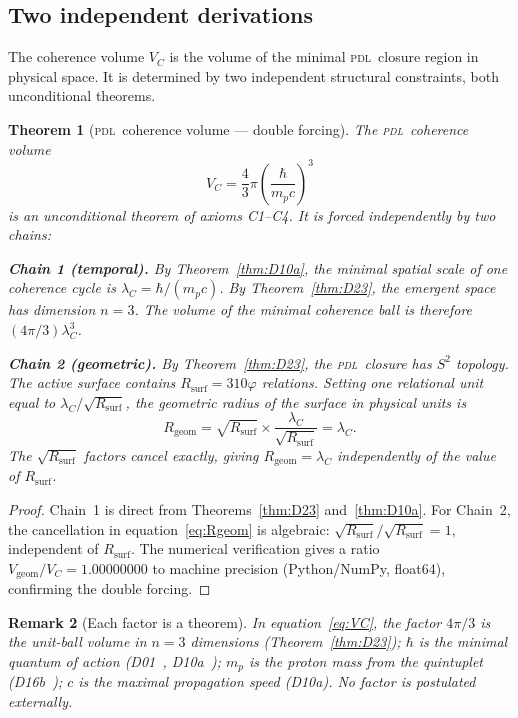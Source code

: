 \documentclass[12pt,a4paper]{article}
\newtheorem{theorem}{Theorem}[section]
\newtheorem{remark}[theorem]{Remark}
\newcommand{\hb}{\hbar}
\newcommand{\PDL}{\textsc{pdl}}
\newcommand{\Rsurf}{R_{\mathrm{surf}}}
\newcommand{\lambdaC}{\lambda_C}
\newcommand{\VC}{V_C}
\newcommand{\vp}{\varphi}
\begin{document}
\subsection{Two independent derivations}

The coherence volume $\VC$ is the volume of the minimal \PDL\ closure region in physical space. It is determined by two independent structural constraints, both unconditional theorems.

\begin{theorem}[\PDL\ coherence volume --- double forcing]
\label{thm:VC}
The \PDL\ coherence volume
\begin{equation}
\VC = \frac{4}{3}\pi\left(\frac{\hb}{m_p c}\right)^3
\label{eq:VC}
\end{equation}
is an unconditional theorem of axioms C1--C4. It is forced independently by two chains:

\medskip
\noindent\textbf{Chain 1 (temporal).} By Theorem~\ref{thm:D10a}, the minimal spatial scale of one coherence cycle is $\lambdaC = \hb/(m_p c)$. By Theorem~\ref{thm:D23}, the emergent space has dimension $n=3$. The volume of the minimal coherence ball is therefore $(4\pi/3)\lambdaC^3$.

\noindent\textbf{Chain 2 (geometric).} By Theorem~\ref{thm:D23}, the \PDL\ closure has $S^2$ topology. The active surface contains $\Rsurf = 310\vp$ relations. Setting one relational unit equal to $\lambdaC/\sqrt{\Rsurf}$, the geometric radius of the surface in physical units is
\begin{equation}
R_{\mathrm{geom}} = \sqrt{\Rsurf}\times\frac{\lambdaC}{\sqrt{\Rsurf}} = \lambdaC.
\label{eq:Rgeom}
\end{equation}
The $\sqrt{\Rsurf}$ factors cancel exactly, giving $R_{\mathrm{geom}} = \lambdaC$ independently of the value of $\Rsurf$.
\end{theorem}

\begin{proof}
Chain~1 is direct from Theorems~\ref{thm:D23} and~\ref{thm:D10a}. For Chain~2, the cancellation in equation~\eqref{eq:Rgeom} is algebraic: $\sqrt{\Rsurf}/\sqrt{\Rsurf} = 1$, independent of $\Rsurf$. The numerical verification gives a ratio $V_{\mathrm{geom}}/\VC = 1.00000000$ to machine precision (Python/NumPy, float64), confirming the double forcing.
\end{proof}

\begin{remark}[Each factor is a theorem]
In equation~\eqref{eq:VC}, the factor $4\pi/3$ is the unit-ball volume in $n=3$ dimensions (Theorem~\ref{thm:D23}); $\hb$ is the minimal quantum of action (D01~\cite{PDL_D01_2026}, D10a~\cite{PDL_D10a_2026}); $m_p$ is the proton mass from the quintuplet (D16b~\cite{PDL_D16b_2026}); $c$ is the maximal propagation speed (D10a). No factor is postulated externally.
\end{remark}
\end{document}
